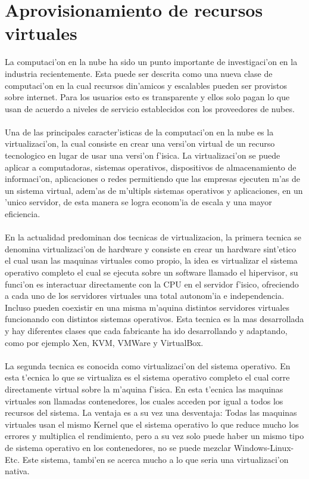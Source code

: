 \chapter{Aprovisionamiento de recursos virtuales}
\label{aprmaqvir}
La computaci'on en la nube ha sido un punto importante de investigaci'on en la industria recientemente. Esta puede ser descrita como una nueva clase de computaci'on en la cual recursos din'amicos y escalables pueden ser provistos sobre internet. Para los usuarios esto es transparente y ellos solo pagan lo que usan de acuerdo a niveles de servicio establecidos con los proveedores de nubes.\\
\\
Una de las principales caracter'isticas de la computaci'on en la nube es la virtualizaci'on, la cual consiste en crear una versi'on virtual de un recurso tecnologico en lugar de usar una versi'on f'isica. La virtualizaci'on se puede aplicar a computadoras, sistemas operativos, dispositivos de almacenamiento de informaci'on, aplicaciones o redes permitiendo que las empresas ejecuten m'as de un sistema virtual, adem'as de m'ultipls sistemas operativos y aplicaciones, en un 'unico servidor, de esta manera se logra econom'ia de escala y una mayor eficiencia.\\
\\
En la actualidad predominan dos tecnicas de virtualizacion, la primera tecnica se denomina virtualizaci'on de hardware y consiste en crear un hardware sint'etico el cual usan las maquinas virtuales como propio, la idea es virtualizar el sistema operativo completo el cual se ejecuta sobre un software llamado el hipervisor, su funci'on es interactuar directamente con la CPU en el servidor f'isico, ofreciendo a cada uno de los servidores virtuales una total autonom'ia e independencia. Incluso pueden coexistir en una misma m'aquina distintos servidores virtuales funcionando con distintos sistemas operativos. Esta tecnica es la mas desarrollada y hay diferentes clases que cada fabricante ha ido desarrollando y adaptando, como por ejemplo Xen, KVM, VMWare y VirtualBox.\\
\\
La segunda tecnica es conocida como virtualizaci'on del sistema operativo. En esta t'ecnica lo que se virtualiza es el sistema operativo completo el cual corre directamente virtual sobre la m'aquina f'isica. En esta t'ecnica las maquinas virtuales son llamadas contenedores, los cuales acceden por igual a todos los recursos del sistema. La ventaja es a su vez una desventaja: Todas las maquinas virtuales usan el mismo Kernel que el sistema operativo lo que reduce mucho los errores y multiplica el rendimiento, pero a su vez solo puede haber un mismo tipo de sistema operativo en los contenedores, no se puede mezclar Windows-Linux-Etc. Este sistema, tambi'en se acerca mucho a lo que seria una virtualizaci'on nativa.\\
